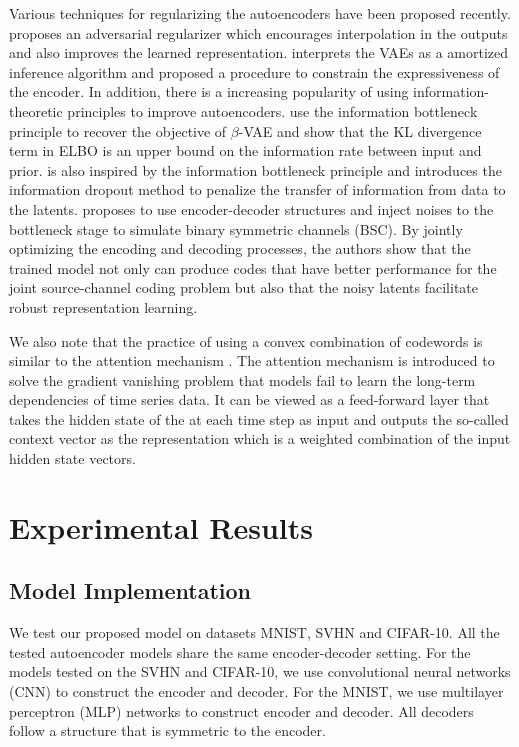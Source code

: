 \documentclass[letterpaper]{article} %
\begin{document}
Various techniques for regularizing the autoencoders have been proposed recently. \cite{DBLP:journals/corr/abs-1807-07543} proposes an adversarial regularizer which encourages interpolation in the outputs and also improves the learned representation. \cite{NIPS2018_7692} interprets the VAEs as a amortized inference algorithm and proposed a procedure to constrain the expressiveness of the encoder. In addition, there is a increasing popularity of using information-theoretic principles to improve autoencoders. \cite{alemi:17:iclr}\cite{pmlr-v80-alemi18a} use the information bottleneck principle \cite{tishby:15:itw} to recover the objective of $\beta$-VAE and show that the KL divergence term in ELBO is an upper bound on the information rate between input and prior. \cite{8253482} is also inspired by the information bottleneck principle and  introduces the information dropout method to penalize the transfer of information from data to the latents. \cite{DBLP:journals/corr/abs-1811-07557} proposes to use encoder-decoder structures and inject noises to the bottleneck stage to simulate binary symmetric channels (BSC). By jointly optimizing the encoding and decoding processes, the authors show that the trained model not only can produce codes that have better performance for the joint source-channel coding problem but also that the noisy latents facilitate robust representation learning.

We also note that the practice of using a convex combination of codewords is similar to the attention mechanism \cite{NIPS2017_7181}. The attention mechanism is introduced to solve the gradient vanishing problem that models fail to learn the long-term dependencies of time series data. It can be viewed as a feed-forward layer that takes the hidden state of the at each time step as input and outputs the so-called context vector as the representation which is a weighted combination of the input hidden state vectors.
\section{Experimental Results}
\subsection{Model Implementation}
We test our proposed model on datasets MNIST, SVHN and CIFAR-10. All the tested autoencoder models share the same encoder-decoder setting. For the models tested on the SVHN and CIFAR-10, we use convolutional neural networks (CNN) to construct the encoder and decoder. For the MNIST, we use multilayer perceptron (MLP) networks to construct encoder and decoder. All decoders follow a structure that is symmetric to the encoder.
\end{document}
